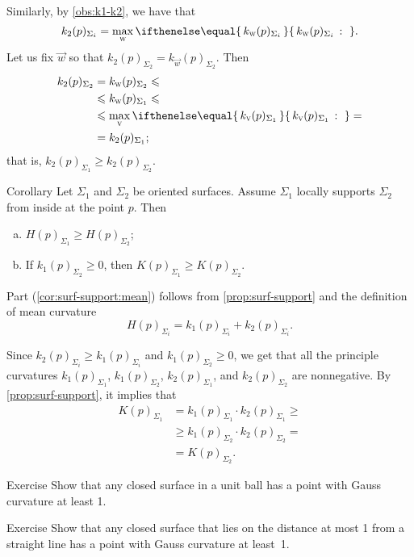 Similarly, by \ref{obs:k1-k2}, we have that
\[k_2(p)_{\Sigma_i}=\max_{\vec w}\set{k_{\vec w}(p)_{\Sigma_i}}{}.\]
Let us fix ${\vec w}$ so that $k_2(p)_{\Sigma_2}=k_{\vec w}(p)_{\Sigma_2}$.
Then 
\begin{align*}
k_2(p)_{\Sigma_2}&=k_{\vec w}(p)_{\Sigma_2}\le
\\
&\le k_{\vec w}(p)_{\Sigma_1}\le
\\
&\le\max_{\vec v}\set{k_{\vec v}(p)_{\Sigma_1}}{}=
\\
&=k_2(p)_{\Sigma_1};
\end{align*}
that is, $k_2(p)_{\Sigma_1}\ge k_2(p)_{\Sigma_2}$.
\qeds

\begin{thm}{Corollary}\label{cor:surf-support}
Let $\Sigma_1$ and $\Sigma_2$ be oriented surfaces.
Assume $\Sigma_1$ locally supports $\Sigma_2$ from inside at the point $p$.
Then
\begin{enumerate}[(a)]
\item\label{cor:surf-support:mean} $H(p)_{\Sigma_1}\ge H(p)_{\Sigma_2}$;
\item\label{cor:surf-support:gauss} If $k_1(p)_{\Sigma_2}\ge 0$, then $K(p)_{\Sigma_1}\ge K(p)_{\Sigma_2}$.
\end{enumerate}
 
\end{thm}

Part (\ref{cor:surf-support:mean}) follows from  \ref{prop:surf-support} and the definition of mean curvature
\[H(p)_{\Sigma_i}=k_1(p)_{\Sigma_i}+k_2(p)_{\Sigma_i}.\]


 Since $k_2(p)_{\Sigma_i}\ge k_1(p)_{\Sigma_i}$ and $k_1(p)_{\Sigma_2}\ge 0$, we get that all the principle curvatures 
$k_1(p)_{\Sigma_1}$, 
$k_1(p)_{\Sigma_2}$, 
$k_2(p)_{\Sigma_1}$, and 
$k_2(p)_{\Sigma_2}$ are nonnegative.
By \ref{prop:surf-support}, it implies that
\begin{align*}
K(p)_{\Sigma_1}&=k_1(p)_{\Sigma_1}\cdot k_2(p)_{\Sigma_1}\ge 
\\
&\ge k_1(p)_{\Sigma_2}\cdot k_2(p)_{\Sigma_2}=
\\
&=K(p)_{\Sigma_2}.
\end{align*}
\qedsf

\begin{thm}{Exercise}\label{ex:positive-gauss}
Show that any closed surface in a unit ball has a point with Gauss curvature at least 1.
\end{thm}

\begin{thm}{Exercise}\label{ex:positive-gauss}
Show that any closed surface that lies on the distance at most 1 from a straight line has a point with Gauss curvature at least~1.
\end{thm}

